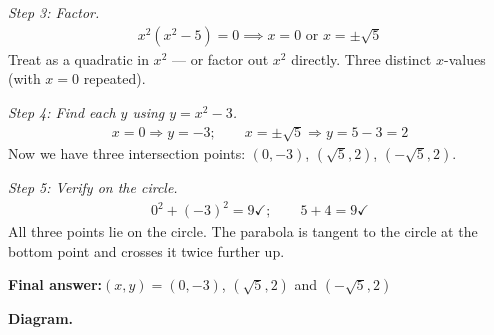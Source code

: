 \documentclass[11pt]{article}
\begin{document}
\textit{Step 3: Factor.}
\[\begin{gathered}
x^2(x^2 - 5) = 0 \implies x = 0 \text{ or } x = \pm \sqrt{5}
\end{gathered}\]
Treat as a quadratic in \( x^2 \) --- or factor out \( x^2 \) directly. Three distinct \( x \)-values (with \( x = 0 \) repeated).

\textit{Step 4: Find each \( y \) using \( y = x^2 - 3 \).}
\[\begin{gathered}
x = 0 \Rightarrow y = -3; \qquad x = \pm \sqrt{5} \Rightarrow y = 5 - 3 = 2
\end{gathered}\]
Now we have three intersection points: \( (0, -3) \), \( (\sqrt{5}, 2) \), \( (-\sqrt{5}, 2) \).

\textit{Step 5: Verify on the circle.}
\[\begin{gathered}
0^2 + (-3)^2 = 9 \checkmark; \qquad 5 + 4 = 9 \checkmark
\end{gathered}\]
All three points lie on the circle. The parabola is tangent to the circle at the bottom point and crosses it twice further up.

\begin{answerbox}
\textbf{Final answer:}\quad \(\displaystyle (x, y) = (0, -3)\), \(\displaystyle (\sqrt{5}, 2)\) and \(\displaystyle (-\sqrt{5}, 2)\)
\end{answerbox}
\textbf{Diagram.}
\end{document}
